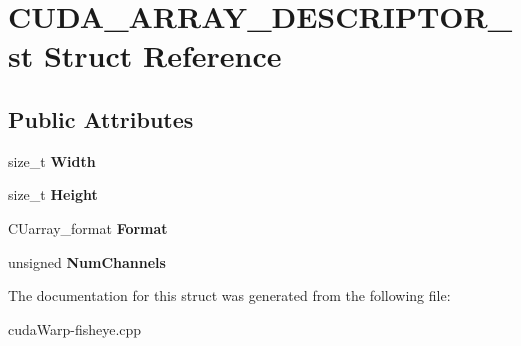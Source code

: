 \hypertarget{structCUDA__ARRAY__DESCRIPTOR__st}{}\section{C\+U\+D\+A\+\_\+\+A\+R\+R\+A\+Y\+\_\+\+D\+E\+S\+C\+R\+I\+P\+T\+O\+R\+\_\+st Struct Reference}
\label{structCUDA__ARRAY__DESCRIPTOR__st}
\subsection*{Public Attributes}
\begin{DoxyCompactItemize}
\item 
size\+\_\+t {\bfseries Width}\hypertarget{structCUDA__ARRAY__DESCRIPTOR__st_a435e2596654f0aea07bfa7db5a37355a}{}\label{structCUDA__ARRAY__DESCRIPTOR__st_a435e2596654f0aea07bfa7db5a37355a}

\item 
size\+\_\+t {\bfseries Height}\hypertarget{structCUDA__ARRAY__DESCRIPTOR__st_a779c9915fbf0da63f46dda09567e8cbb}{}\label{structCUDA__ARRAY__DESCRIPTOR__st_a779c9915fbf0da63f46dda09567e8cbb}

\item 
C\+Uarray\+\_\+format {\bfseries Format}\hypertarget{structCUDA__ARRAY__DESCRIPTOR__st_a7692722d7a1dfc6beab10d471a1c9de1}{}\label{structCUDA__ARRAY__DESCRIPTOR__st_a7692722d7a1dfc6beab10d471a1c9de1}

\item 
unsigned {\bfseries Num\+Channels}\hypertarget{structCUDA__ARRAY__DESCRIPTOR__st_afd6106c1fa27205432a50f9539c9265f}{}\label{structCUDA__ARRAY__DESCRIPTOR__st_afd6106c1fa27205432a50f9539c9265f}

\end{DoxyCompactItemize}


The documentation for this struct was generated from the following file\+:\begin{DoxyCompactItemize}
\item 
cuda\+Warp-\/fisheye.\+cpp\end{DoxyCompactItemize}
